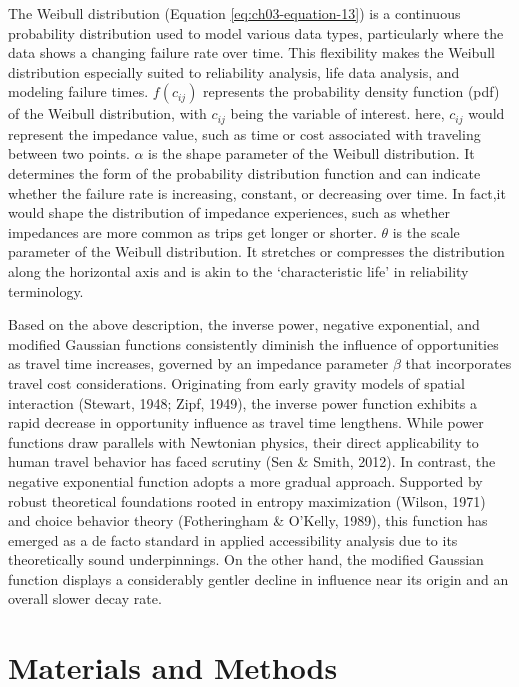 \documentclass[
11pt, %
oneside, %
english, %
singlespacing, %
]{macthesis} %
\begin{document}
The Weibull distribution (Equation \ref{eq:ch03-equation-13}) is a continuous probability distribution used to model various data types, particularly where the data shows a changing failure rate over time. This flexibility makes the Weibull distribution especially suited to reliability analysis, life data analysis, and modeling failure times. \(f(c_{ij})\) represents the probability density function (pdf) of the Weibull distribution, with \(c_{ij}\) being the variable of interest. here, \(c_{ij}\) would represent the impedance value, such as time or cost associated with traveling between two points. \(\alpha\) is the shape parameter of the Weibull distribution. It determines the form of the probability distribution function and can indicate whether the failure rate is increasing, constant, or decreasing over time. In fact,it would shape the distribution of impedance experiences, such as whether impedances are more common as trips get longer or shorter. \(\theta\) is the scale parameter of the Weibull distribution. It stretches or compresses the distribution along the horizontal axis and is akin to the `characteristic life' in reliability terminology.

Based on the above description, the inverse power, negative exponential, and modified Gaussian functions consistently diminish the influence of opportunities as travel time increases, governed by an impedance parameter \(\beta\) that incorporates travel cost considerations. Originating from early gravity models of spatial interaction (Stewart, 1948; Zipf, 1949), the inverse power function exhibits a rapid decrease in opportunity influence as travel time lengthens. While power functions draw parallels with Newtonian physics, their direct applicability to human travel behavior has faced scrutiny (Sen \& Smith, 2012). In contrast, the negative exponential function adopts a more gradual approach. Supported by robust theoretical foundations rooted in entropy maximization (Wilson, 1971) and choice behavior theory (Fotheringham \& O'Kelly, 1989), this function has emerged as a de facto standard in applied accessibility analysis due to its theoretically sound underpinnings. On the other hand, the modified Gaussian function displays a considerably gentler decline in influence near its origin and an overall slower decay rate.

\section{Materials and Methods}\label{materials-and-methods}
\end{document}
